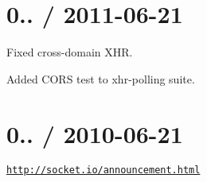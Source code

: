 \section*{0.. / 2011-\/06-\/21 }


\begin{DoxyItemize}
\item Fixed cross-\/domain X\+HR.
\item Added C\+O\+RS test to xhr-\/polling suite.
\end{DoxyItemize}

\section*{0.. / 2010-\/06-\/21 }


\begin{DoxyItemize}
\item \href{http://socket.io/announcement.html}{\tt http\+://socket.\+io/announcement.\+html} 
\end{DoxyItemize}